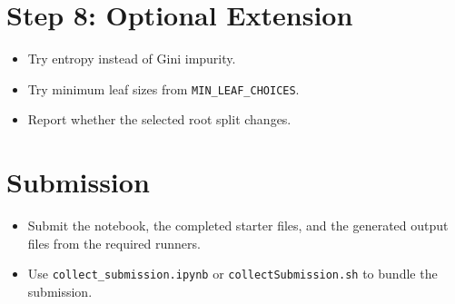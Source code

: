 \section*{Step 8: Optional Extension}
\begin{itemize}
  \item Try entropy instead of Gini impurity.
  \item Try minimum leaf sizes from \texttt{MIN\_LEAF\_CHOICES}.
  \item Report whether the selected root split changes.
\end{itemize}

\section*{Submission}
\begin{itemize}
  \item Submit the notebook, the completed starter files, and the generated output files from the required runners.
  \item Use \texttt{collect\_submission.ipynb} or \texttt{collectSubmission.sh} to bundle the submission.
\end{itemize}
